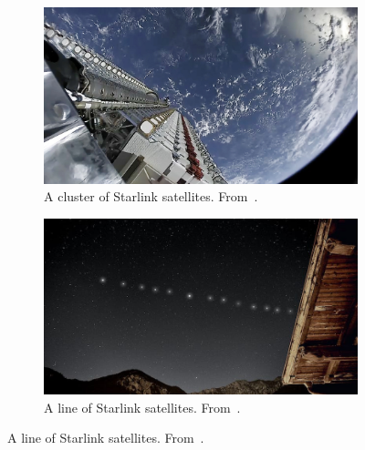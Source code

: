 \documentclass{article}
\begin{document}
\begin{figure}[h!]
    \centering

    \begin{subfigure}[b]{0.49\textwidth}
        \centering
        \includegraphics[width=\textwidth]{LaTeX/Figures/Starlink_cluster.jpg}
        \caption{A cluster of Starlink satellites. From~\cite{wikimedia_starlink_mission_2020}.}
        \label{fig:starlink_cluster}
    \end{subfigure}\hfill %
    \begin{subfigure}[b]{0.49\textwidth}
        \centering
        \includegraphics[width=\textwidth]{LaTeX/Figures/SPACEX-STARLINK-SATELLITES-CONSTELLATION.jpeg}
        \caption{A line of Starlink satellites. From~\cite{earthsky_starlink_2021}.}
        \label{fig:starlink_line}
    \end{subfigure}
    
\end{figure}
\end{document}
